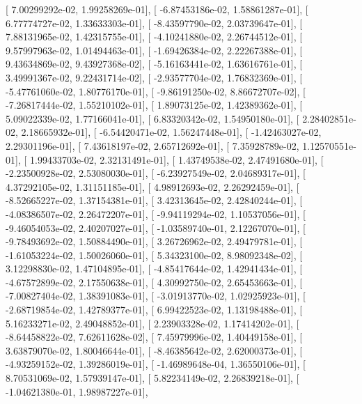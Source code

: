 \documentclass{article}
\begin{document}
       [  7.00299292e-02,   1.99258269e-01],
       [ -6.87453186e-02,   1.58861287e-01],
       [  6.77774727e-02,   1.33633303e-01],
       [ -8.43597790e-02,   2.03739647e-01],
       [  7.88131965e-02,   1.42315755e-01],
       [ -4.10241880e-02,   2.26744512e-01],
       [  9.57997963e-02,   1.01494463e-01],
       [ -1.69426384e-02,   2.22267388e-01],
       [  9.43634869e-02,   9.43927368e-02],
       [ -5.16163441e-02,   1.63616761e-01],
       [  3.49991367e-02,   9.22431714e-02],
       [ -2.93577704e-02,   1.76832369e-01],
       [ -5.47761060e-02,   1.80776170e-01],
       [ -9.86191250e-02,   8.86672707e-02],
       [ -7.26817444e-02,   1.55210102e-01],
       [  1.89073125e-02,   1.42389362e-01],
       [  5.09022339e-02,   1.77166041e-01],
       [  6.83320342e-02,   1.54950180e-01],
       [  2.28402851e-02,   2.18665932e-01],
       [ -6.54420471e-02,   1.56247448e-01],
       [ -1.42463027e-02,   2.29301196e-01],
       [  7.43618197e-02,   2.65712692e-01],
       [  7.35928789e-02,   1.12570551e-01],
       [  1.99433703e-02,   2.32131491e-01],
       [  1.43749538e-02,   2.47491680e-01],
       [ -2.23500928e-02,   2.53080030e-01],
       [ -6.23927549e-02,   2.04689317e-01],
       [  4.37292105e-02,   1.31151185e-01],
       [  4.98912693e-02,   2.26292459e-01],
       [ -8.52665227e-02,   1.37154381e-01],
       [  3.42313645e-02,   2.42840244e-01],
       [ -4.08386507e-02,   2.26472207e-01],
       [ -9.94119294e-02,   1.10537056e-01],
       [ -9.46054053e-02,   2.40207027e-01],
       [ -1.03589740e-01,   2.12267070e-01],
       [ -9.78493692e-02,   1.50884490e-01],
       [  3.26726962e-02,   2.49479781e-01],
       [ -1.61053224e-02,   1.50026060e-01],
       [  5.34323100e-02,   8.98092348e-02],
       [  3.12298830e-02,   1.47104895e-01],
       [ -4.85417644e-02,   1.42941434e-01],
       [ -4.67572899e-02,   2.17550638e-01],
       [  4.30992750e-02,   2.65453663e-01],
       [ -7.00827404e-02,   1.38391083e-01],
       [ -3.01913770e-02,   1.02925923e-01],
       [ -2.68719854e-02,   1.42789377e-01],
       [  6.99422523e-02,   1.13198488e-01],
       [  5.16233271e-02,   2.49048852e-01],
       [  2.23903328e-02,   1.17414202e-01],
       [ -8.64458822e-02,   7.62611628e-02],
       [  7.45979996e-02,   1.40449158e-01],
       [  3.63879070e-02,   1.80046644e-01],
       [ -8.46385642e-02,   2.62000373e-01],
       [ -4.93259152e-02,   1.39286019e-01],
       [ -1.46989648e-04,   1.36550106e-01],
       [  8.70531069e-02,   1.57939147e-01],
       [  5.82234149e-02,   2.26839218e-01],
       [ -1.04621380e-01,   1.98987227e-01],
\end{document}
